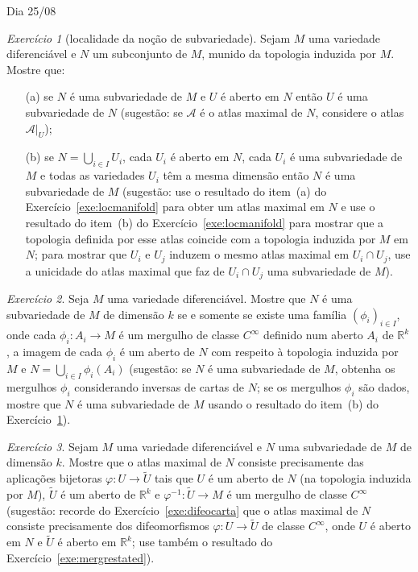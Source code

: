 \documentclass[oneside,11pt]{amsart}
\newcommand{\R}{\mathds R}
\theoremstyle{remark}\newtheorem{exercise}{Exercício}[section]
\theoremstyle{plain}\newtheorem{teo}{Teorema}[section]
\theoremstyle{plain}\newtheorem{lem}[teo]{Lema}
\theoremstyle{plain}\newtheorem{prop}[teo]{Proposição}
\theoremstyle{definition}\newtheorem{defin}[teo]{Definição}
\theoremstyle{remark}\newtheorem{rem}[teo]{Observação}
\theoremstyle{definition}\newtheorem{example}[teo]{Exemplo}
\numberwithin{equation}{section}
\begin{document}
\begin{section}{Dia 25/08}
\begin{exercise}[localidade da noção de subvariedade]\label{exe:subvarlocal}
Sejam $M$ uma variedade diferenciável e $N$ um subconjunto de $M$, munido da topologia induzida por $M$. Mostre que:
\begin{itemize}
\item[(a)] se $N$ é uma subvariedade de $M$ e $U$ é aberto em $N$ então $U$ é uma subvariedade de $N$ (sugestão: se $\mathcal A$ é o atlas maximal
de $N$, considere o atlas $\mathcal A\vert_U$);
\item[(b)] se $N=\bigcup_{i\in I}U_i$, cada $U_i$ é aberto em $N$, cada $U_i$ é uma subvariedade de $M$ e todas as variedades $U_i$ têm a mesma dimensão
então $N$ é uma subvariedade de $M$ (sugestão: use o resultado do item~(a) do Exercício~\ref{exe:locmanifold} para
obter um atlas maximal em $N$ e use o resultado do item~(b) do Exercício~\ref{exe:locmanifold} para mostrar que a
topologia definida por esse atlas coincide com a topologia induzida por $M$ em $N$; para mostrar que $U_i$ e $U_j$ induzem o mesmo
atlas maximal em $U_i\cap U_j$, use a unicidade do atlas maximal que faz de $U_i\cap U_j$ uma subvariedade de $M$).
\end{itemize}
\end{exercise}

\begin{exercise}
Seja $M$ uma variedade diferenciável. Mostre que $N$ é uma subvariedade de $M$ de dimensão $k$ se e somente se existe uma família $(\phi_i)_{i\in I}$,
onde cada $\phi_i:A_i\to M$ é um mergulho de classe $C^\infty$ definido num aberto $A_i$ de $\R^k$, a imagem de cada $\phi_i$ é um aberto de $N$
com respeito à topologia induzida por $M$ e $N=\bigcup_{i\in I}\phi_i(A_i)$ (sugestão: se $N$ é uma subvariedade de $M$, obtenha os mergulhos $\phi_i$
considerando inversas de cartas de $N$; se os mergulhos $\phi_i$ são dados, mostre que $N$ é uma subvariedade
de $M$ usando o resultado do item~(b) do Exercício~\ref{exe:subvarlocal}).
\end{exercise}

\begin{exercise}
Sejam $M$ uma variedade diferenciável e $N$ uma subvariedade de $M$ de dimensão $k$. Mostre que o atlas maximal de $N$ consiste precisamente das aplicações
bijetoras $\varphi:U\to\widetilde U$ tais que $U$ é um aberto de $N$ (na topologia induzida por $M$), $\widetilde U$ é um aberto de $\R^k$ e
$\varphi^{-1}:\widetilde U\to M$ é um mergulho de classe $C^\infty$ (sugestão: recorde do Exercício~\ref{exe:difeocarta} que o atlas
maximal de $N$ consiste precisamente dos difeomorfismos $\varphi:U\to\widetilde U$ de classe $C^\infty$, onde $U$
é aberto em $N$ e $\widetilde U$ é aberto em $\R^k$; use também o resultado do Exercício~\ref{exe:mergrestated}).
\end{exercise}


\end{section}
\end{document}
